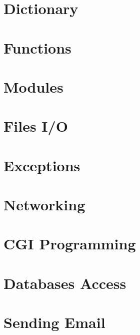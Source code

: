 \documentclass{wileySix}
\begin{document}
\chapter{Dictionary}


\chapter{Functions}


\chapter{Modules}


\chapter{Files I/O}


\chapter{Exceptions}


%

%


\chapter{Networking}


\chapter{CGI Programming}


\chapter{Databases Access}

 
\chapter{Sending Email}

\end{document}
